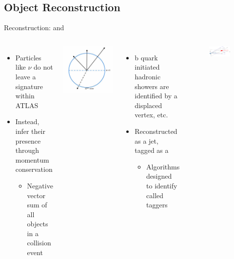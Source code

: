 \documentclass[aspectratio=169,xcolor=table]{beamer}
\begin{document}
  \subsection{Object Reconstruction}

    \begin{frame}[t]{Reconstruction: \Etm and \bjets}
     \begin{columns}[t]
        \begin{itemize}
          \item Particles like $\nu$ do not leave a signature within ATLAS
          \item Instead, infer their presence through momentum conservation
          \begin{itemize}
            \item Negative vector sum of all objects in a collision event
          \end{itemize}
        \end{itemize}
        \centering
        \includegraphics[width=.5\textwidth,keepaspectratio=true]{MET_Diagram.png}

      \begin{itemize}
        \item b quark initiated hadronic showers are identified by a displaced vertex, etc.
        \item Reconstructed as a jet, tagged as a \bjet
        \begin{itemize}
          \item Algorithms designed to identify \bjets called taggers \cite{b-tagging}
        \end{itemize}
      \end{itemize}
      \begin{figure}[!ht]
      \centering
      \includegraphics[width=.7\textwidth,keepaspectratio=true]{chapters/chapter5_eventreconnstruction/images/b-jet-schetch.png}
      \caption{\tiny \cite{bjet-trigger}}
      \end{figure}
      \end{columns}
    \end{frame}
\end{document}
